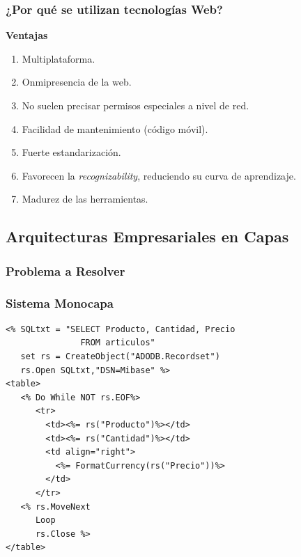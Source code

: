 \documentclass[a4paper,slidestop,xcolor=pst,dvips,blue]{beamer}
\begin{document}
\begin{frame}[c]
	\frametitle{¿Por qué se utilizan tecnologías Web?}
    \centering \textbf{Ventajas} \\
    \begin{enumerate}
        \item<2-> Multiplataforma.
        \item<3-> Onmipresencia de la web.
        \item<4-> No suelen precisar permisos especiales a nivel de red.
        \item<5-> Facilidad de mantenimiento (código móvil).
        \item<6-> Fuerte estandarización.
        \item<7-> Favorecen la \emph{recognizability}, reduciendo su curva de aprendizaje.
        \item<8-> Madurez de las herramientas.
    \end{enumerate}
\end{frame}

\subsection{Arquitecturas Empresariales en Capas}

\subsubsection{Problema a Resolver}

\begin{frame}[c,fragile]
	\frametitle{Sistema Monocapa}
    \begin{lstlisting}[basicstyle=\small]
<% SQLtxt = "SELECT Producto, Cantidad, Precio
               FROM articulos"
   set rs = CreateObject("ADODB.Recordset")
   rs.Open SQLtxt,"DSN=Mibase" %>
<table>
   <% Do While NOT rs.EOF%>
      <tr>
        <td><%= rs("Producto")%></td>
        <td><%= rs("Cantidad")%></td>
        <td align="right">
          <%= FormatCurrency(rs("Precio"))%>
        </td>
      </tr>
   <% rs.MoveNext
      Loop
      rs.Close %>
</table>
    \end{lstlisting}
\end{frame}
\end{document}
